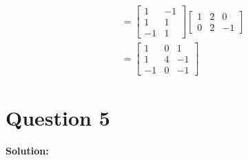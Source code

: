 \documentclass[11pt]{article} %
\begin{document}
\begin{enumerate}
\begin{align*}
	[S][T]&=\begin{bmatrix}
		1&-1\\
		1&1\\
		-1&1
	\end{bmatrix}\begin{bmatrix}
	1&2&0\\
	0&2&-1
\end{bmatrix}\\
&=\begin{bmatrix}
	1&0&1\\
	1&4&-1\\
	-1&0&-1
\end{bmatrix}
\end{align*}
\end{enumerate}


\section{Question 5}

\textbf{Solution:}
\end{document}
